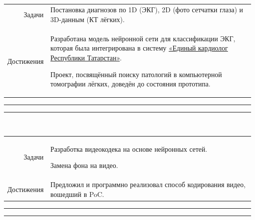 \documentclass[11pt]{article}
\renewenvironment{itemize}{
	\begin{list}{\labelitemi}{
			\setlength{\topsep   }{0pt}
			\setlength{\partopsep}{0pt}
			\setlength{\parskip  }{0pt}
			\setlength{\parsep   }{0pt}
			\setlength{\itemsep  }{0pt}
		}
	}{\end{list}}
\begin{document}
		\\
		\begin{tabular} {r | p{}}
			Задачи & Постановка диагнозов по 1D (ЭКГ), 2D (фото сетчатки глаза) и 3D-данным (КТ лёгких). \\
			Достижения &
			\begin{itemize}
				\item Разработана модель нейронной сети для классификации ЭКГ, которая была интегрирована в систему \href{https://va1235.wixsite.com/tis-tat/edinyj-kardiolog-respubliki-tatarst}{«Единый кардиолог Республики Татарстан»}.
				\item Проект, посвящённый поиску патологий в компьютерной томографии лёгких, доведён до состояния прототипа.
			\end{itemize}
		\end{tabular}
		\vspace{0.3em}\hrule\vspace{0.1em}\hrule\vspace{0.5em}
		
		\\
		\begin{tabular} {r | p{}}
			Задачи &
			\begin{itemize}
				\item Разработка видеокодека на основе нейронных сетей.
				\item Замена фона на видео.
			\end{itemize}
			\\
			Достижения &
			Предложил и программно реализовал способ кодирования видео, вошедший в PoC.
		\end{tabular}
		\vspace{0.3em}\hrule\vspace{0.1em}\hrule\vspace{0.5em}
		
\end{document}
